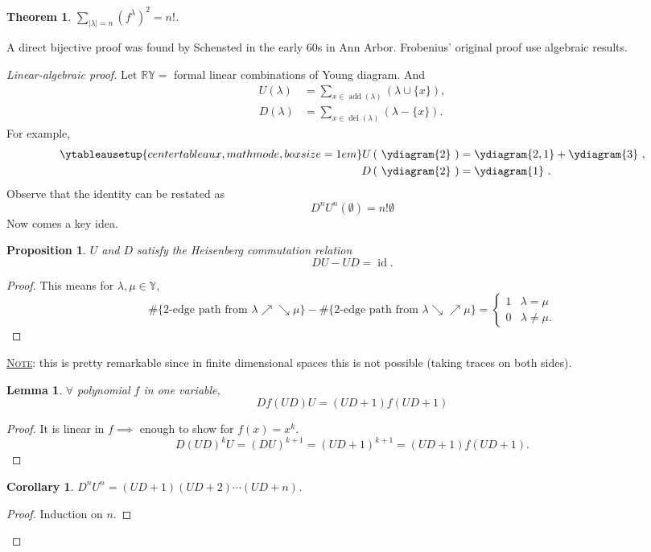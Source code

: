 \documentclass{report}
\newcommand{\R}{\mathbb{R}}
\def \id {\operatorname{id}}
\def \del {\operatorname{del}}
\def \add {\operatorname{add}}
\newcommand{\fancyem}[1]{\underline{\textsc{#1}}}
\newtheorem{theorem}{Theorem}[section]
\newtheorem{corollary}{Corollary}[section]
\newtheorem{lemma}{Lemma}[section]
\newtheorem{proposition}{Proposition}[section]
\theoremstyle{definition}
\theoremstyle{remark}
\numberwithin{equation}{section}
\begin{document}
\begin{theorem}
    $\displaystyle \sum_{|\lambda| = n}(f^{\lambda})^2 = n!$.
\end{theorem}
A direct bijective proof was found by Schensted in the early 60s in Ann Arbor. Frobenius' original proof use algebraic results. 
\begin{proof}[Linear-algebraic proof]
    Let $\R\mathbb Y = $ formal linear combinations of Young diagram. And \begin{align*}
        U(\lambda) & = \sum_{x \in \add(\lambda)}(\lambda \cup \{x\}), \\
        D(\lambda) & = \sum_{x \in \del(\lambda)}(\lambda - \{x\}).
    \end{align*}
    For example, \begin{align*}
        \ytableausetup{centertableaux, mathmode, boxsize=1em}
        U\left(\ \ydiagram{2}\ \right) & = \ydiagram{2, 1} + \ydiagram{3}\ , \\
        D\left(\ \ydiagram{2}\ \right) & = \ydiagram{1}\ .
    \end{align*}
    Observe that the identity can be restated as \begin{equation}\label{eq:empty}
        D^nU^n(\emptyset) = n!\emptyset 
    \end{equation}
    Now comes a key idea.
    \begin{proposition}
        $U$ and $D$ satisfy the \emph{Heisenberg commutation relation} \[
            DU - UD = \id.    
        \]
    \end{proposition}
    \begin{proof}\let\qed\relax
        This means for $\lambda, \mu \in \mathbb{Y}$, \[
            \#\{\text{$2$-edge path from $\lambda \nearrow \searrow \mu$}\} - 
            \#\{\text{$2$-edge path from $\lambda \searrow \nearrow \mu$}\} =
            \begin{cases}
                1 & \lambda = \mu \\
                0 & \lambda \neq \mu.
            \end{cases}
        \]
    \end{proof}
    \fancyem{Note}: this is pretty remarkable since in finite dimensional spaces this is not possible (taking traces on both sides).

    \begin{lemma}
        $\forall$ polynomial $f$ in one variable, \[
            Df(UD)U = (UD + 1)f(UD + 1)    
        \]
    \end{lemma}
    \begin{proof}\let\qed\relax
        It is linear in $f \implies$ enough to show for $f(x) = x^k$.
        \[
            D(UD)^kU = (DU)^{k + 1} = (UD + 1)^{k + 1} = (UD + 1)f(UD + 1).
        \]
    \end{proof}
    \begin{corollary}
        $D^nU^n = (UD + 1)(UD + 2)\cdots(UD + n)$.
    \end{corollary}
    \begin{proof}\let\qed\relax
        Induction on $n$.


\end{proof}
\end{proof}
\end{document}
